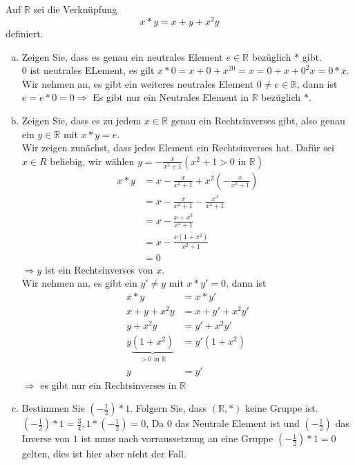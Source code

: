 \documentclass{article}
\newcommand{\R}{\mathbb{R}}
\begin{document}
\subsection{}
\color{blue}
Auf $\R$ sei die Verknüpfung
\[
  x \ast y = x + y + x^2 y
\]
definiert.
\color{black}
\begin{enumerate}[(a)]
    \item
        \color{blue}
        Zeigen Sie, dass es genau ein neutrales Element $e \in \R$ bezüglich
        $\ast$ gibt.\\
        \color{black}
        $0$ ist neutrales ELement, es gilt $x*0=x+0+x^20=x=0+x+0^2x=0*x$.
        Wir nehmen an, es gibt ein weiteres neutrales Element $0\neq e\in\R$,
        dann ist $e=e*0=0\Rightarrow$ Es gibt nur ein Neutrales Element in $\R$ bezüglich $*$.
    \item
        \color{blue}
        Zeigen Sie, dass es zu jedem $x \in \R$ genau ein Rechtsinverses gibt,
        also genau ein $y \in \R$ mit $x \ast y = e$.\\
        \color{black}
        Wir zeigen zunächst, dass jedes Element ein Rechtsinverses hat.
        Dafür sei $x\in R$ beliebig, wir wählen $y=-\frac{x}{x^2+1}(x^2+1>0\text{ in }\R)$
        \begin{align*}
            x*y
            &=x-\frac{x}{x^2+1}+x^2(-\frac{x}{x^2+1})\\
            &=x-\frac{x}{x^2+1}-\frac{x^3}{x^2+1}\\
            &=x-\frac{x+x^3}{x^2+1}\\
            &=x-\frac{x(1+x^2)}{x^2+1}\\
            &=0
        \end{align*}
        $\Rightarrow y$ ist ein Rechtsinverses von $x$.\\
        Wir nehmen an, es gibt ein $y'\neq y$ mit $x*y'=0$,
        dann ist
        \begin{align*}
            x*y&=x*y'\\
            x+y+x^2y&=x+y'+x^2y'\\
            y+x^2y&=y'+x^2y'\\
            y\underbrace{(1+x^2)}_{>0\text{ in }\R}&=y'(1+x^2)\\
            y&=y'
        \end{align*}
        $\Rightarrow$ es gibt nur ein Rechtsinverses in $\R$
    \item
        \color{blue}
        Bestimmen Sie $\left(-\tfrac{1}{2}\right) \ast 1$. Folgern Sie, dass
        $(\R,\ast)$ keine Gruppe ist.\\
        \color{black}
        $\left(-\frac{1}{2}\right)*1=\frac{3}{4},1*\left(-\frac{1}{2}\right)=0$, Da $0$ das Neutrale Element ist
        und $\left(-\frac{1}{2}\right)$ das Inverse von $1$ ist muss nach vorraussetzung an eine Gruppe
        $\left(-\frac{1}{2}\right)*1=0$ gelten, dies ist hier aber nicht der Fall.
\end{enumerate}
\end{document}
